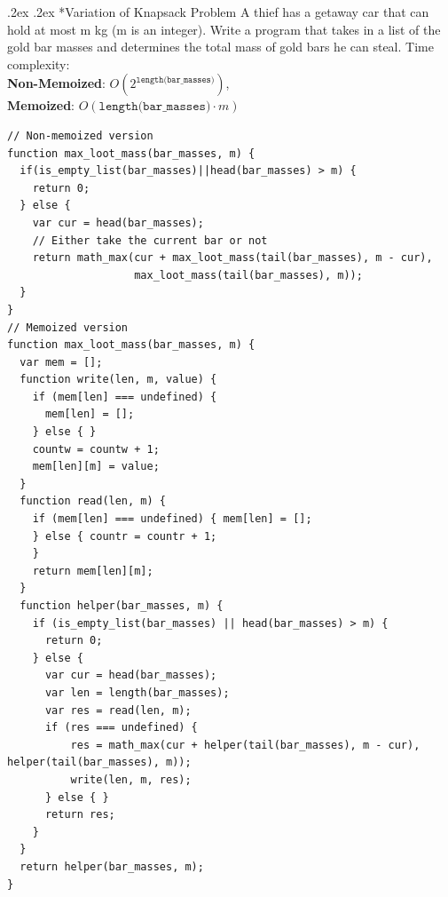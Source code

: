 \documentclass[10pt,portrait,a4paper]{article}
\makeatletter
\renewcommand{\subsection}{\@startsection{subsection}{1}{0mm}%
                                {.2ex}%
                                {.2ex}%
                                {\sffamily\bfseries}}
\makeatother
\begin{document}
\begin{multicols*}{4}
\subsection*{Variation of Knapsack Problem}
A thief has a getaway car that can hold at most m kg (m is an integer). Write a program that takes in a list of the gold bar masses and determines the total mass of gold bars he can steal. Time complexity:\\
\textbf{Non-Memoized}: $O(2^{\texttt{length(bar\_masses)}})$,\\
\textbf{Memoized}: $O(\texttt{length(bar\_masses)}\cdot m)$
\begin{verbatim}
// Non-memoized version
function max_loot_mass(bar_masses, m) {
  if(is_empty_list(bar_masses)||head(bar_masses) > m) {
    return 0;
  } else {
    var cur = head(bar_masses);
    // Either take the current bar or not
    return math_max(cur + max_loot_mass(tail(bar_masses), m - cur),
                    max_loot_mass(tail(bar_masses), m));
  }
}
// Memoized version
function max_loot_mass(bar_masses, m) {
  var mem = [];
  function write(len, m, value) {
    if (mem[len] === undefined) {
      mem[len] = [];
    } else { }
    countw = countw + 1;
    mem[len][m] = value;
  }
  function read(len, m) {
    if (mem[len] === undefined) { mem[len] = [];
    } else { countr = countr + 1;
    }
    return mem[len][m];
  }
  function helper(bar_masses, m) {
    if (is_empty_list(bar_masses) || head(bar_masses) > m) {
      return 0;
    } else {
      var cur = head(bar_masses);
      var len = length(bar_masses);
      var res = read(len, m);
      if (res === undefined) {
          res = math_max(cur + helper(tail(bar_masses), m - cur), helper(tail(bar_masses), m));
          write(len, m, res);
      } else { }
      return res;
    }
  }
  return helper(bar_masses, m);
}
\end{verbatim}


\end{multicols*}
\end{document}
